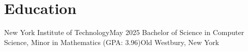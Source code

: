 \section{Education}
    \resumeSubHeadingListStart
    \resumeSubheading
    {New York Institute of Technology}{May 2025}
    {Bachelor of Science in Computer Science, Minor in Mathematics (GPA: 3.96)}{Old Westbury, New York}
    \resumeSubHeadingListEnd